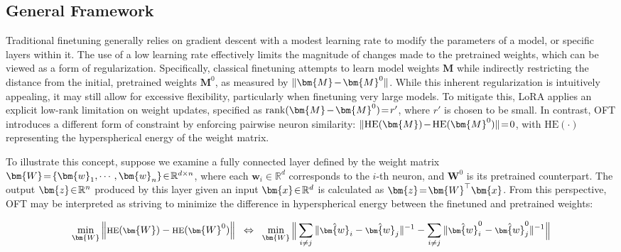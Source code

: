 \subsection{General Framework}

Traditional finetuning generally relies on gradient descent with a modest learning rate to modify the parameters of a model, or specific layers within it. The use of a low learning rate effectively limits the magnitude of changes made to the pretrained weights, which can be viewed as a form of regularization. Specifically, classical finetuning attempts to learn model weights $\bm{M}$ while indirectly restricting the distance from the initial, pretrained weights $\bm{M}^0$, as measured by $\thickmuskip=2mu \medmuskip=2mu \| \bm{M} - \bm{M}^0\|$. While this inherent regularization is intuitively appealing, it may still allow for excessive flexibility, particularly when finetuning very large models. To mitigate this, LoRA applies an explicit low-rank limitation on weight updates, specified as $\thickmuskip=2mu \medmuskip=2mu \text{rank}(\bm{M} - \bm{M}^0)=r'$, where $r'$ is chosen to be small. In contrast, OFT introduces a different form of constraint by enforcing pairwise neuron similarity: $\thickmuskip=2mu \medmuskip=2mu \| \text{HE}(\bm{M})-\text{HE}(\bm{M}^0) \|=0$, with $\text{HE}(\cdot)$ representing the hyperspherical energy of the weight matrix. 

To illustrate this concept, suppose we examine a fully connected layer defined by the weight matrix $\thickmuskip=2mu \medmuskip=2mu \bm{W}=\{\bm{w}_1,\cdots,\bm{w}_n\}\in\mathbb{R}^{d\times n}$, where each $\bm{w}_i\in\mathbb{R}^{d}$ corresponds to the $i$-th neuron, and $\bm{W}^0$ is its pretrained counterpart. The output $\thickmuskip=2mu \medmuskip=2mu \bm{z}\in\mathbb{R}^n$ produced by this layer given an input $\thickmuskip=2mu \medmuskip=2mu \bm{x}\in\mathbb{R}^d$ is calculated as $\thickmuskip=2mu \medmuskip=2mu \bm{z}=\bm{W}^\top\bm{x}$. From this perspective, OFT may be interpreted as striving to minimize the difference in hyperspherical energy between the finetuned and pretrained weights:

\begin{equation}\label{eq:oft_principle}
\footnotesize
\min_{\bm{W}} \left\| \text{HE}(\bm{W})-\text{HE}(\bm{W}^0)\right\|~~\Leftrightarrow~~\min_{\bm{W}} \bigg{\|} \sum_{i\neq j} \|\hat{\bm{w}}_i-\hat{\bm{w}}_j\|^{-1}-\sum_{i\neq j} \|\hat{\bm{w}}^0_i-\hat{\bm{w}}^0_j\|^{-1}\bigg{\|}
\end{equation}

